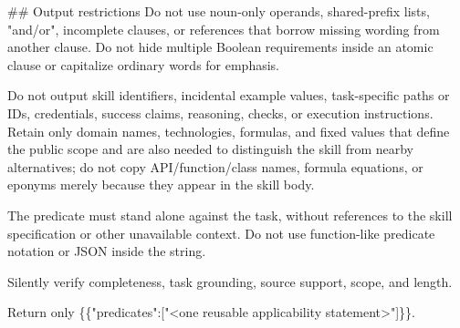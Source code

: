 \par\smallskip
\#\# Output restrictions Do not use noun-only operands, shared-prefix lists, "and/or", incomplete clauses, or references that borrow missing wording from another clause. Do not hide multiple Boolean requirements inside an atomic clause or capitalize ordinary words for emphasis.
\par\smallskip
Do not output skill identifiers, incidental example values, task-specific paths or IDs, credentials, success claims, reasoning, checks, or execution instructions. Retain only domain names, technologies, formulas, and fixed values that define the public scope and are also needed to distinguish the skill from nearby alternatives; do not copy API/function/class names, formula equations, or eponyms merely because they appear in the skill body.
\par\smallskip
The predicate must stand alone against the task, without references to the skill specification or other unavailable context. Do not use function-like predicate notation or JSON inside the string.
\par\smallskip
Silently verify completeness, task grounding, source support, scope, and length.
\par\smallskip
Return only \{\{"predicates":["<one reusable applicability statement>"]\}\}.
\par
\endgroup
